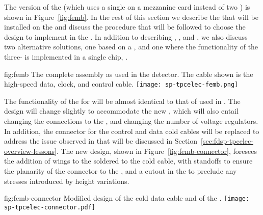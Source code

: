The  version of the  (which uses a single 
 on a mezzanine card instead of two  
) is shown in Figure~\ref{fig:femb}. In the rest of
this section we describe the  that will be installed
on the  and discuss the procedure that will be 
followed to choose the  design %
to implement in the %
. %
In addition to
describing , , and ,
we also discuss two alternative solutions, one based on a 
 , and one where the functionality of the
three- is implemented in a single chip, .

\begin{dunefigure}
{fig:femb}
{The complete  assembly as used in the  
detector. The cable shown is the high-speed data, clock, and control cable.}
\texttt{[image: sp-tpcelec-femb.png]}
\end{dunefigure}

The functionality of the  for  will be
almost identical to that of  used in .
The design will change slightly to accommodate the new ,
which will also entail changing the connections to the ,
and changing the number of voltage regulators. In addition, the
connector for the control and data cold cables will be replaced
to address the issue observed in  that will be discussed
in Section~\ref{sec:fdsp-tpcelec-overview-lessons}. The new design,
shown in Figure~\ref{fig:femb-connector}, foresees the addition
of wings to the  soldered to the cold cable, with 
standoffs to ensure the planarity of the connector
to the , and a cutout in the  to preclude %
any stresses introduced by height variations.

\begin{dunefigure}
{fig:femb-connector}
{Modified design of the cold data cable and of the  .}
\texttt{[image: sp-tpcelec-connector.pdf]}
\end{dunefigure}

